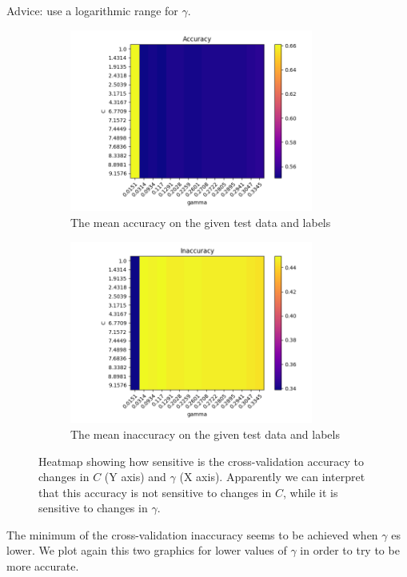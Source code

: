\documentclass[12pt,letterpaper]{article}
\begin{document}
Advice: use a logarithmic range for $\gamma$.

\begin{figure}[H]
    \begin{subfigure}{0.5\textwidth}
    \includegraphics[width=8cm]{images/accuracy_1.jpg} 
    \caption{The mean accuracy on the given test data and labels}
    \label{fig:subfig1}
    \end{subfigure}
    \begin{subfigure}{0.5\textwidth}
    \includegraphics[width=8cm]{images/inaccuracy_1.jpg}
    \caption{The mean inaccuracy on the given test data and labels}
    \label{fig:subfiig2}
    \end{subfigure}
    \caption{Heatmap showing how sensitive is the cross-validation accuracy to changes in $C$ (Y axis) and  $\gamma$ (X axis). Apparently we can interpret that this accuracy is not sensitive to changes in $C$, while it is sensitive to changes in $\gamma$.}
\end{figure}

The minimum of the cross-validation inaccuracy seems to be achieved when $\gamma$ es lower. We plot again this two graphics for lower values of $\gamma$ in order to try to be more accurate.
\end{document}
